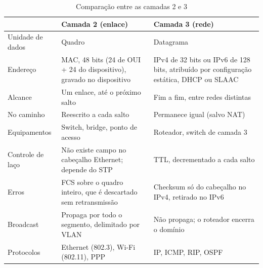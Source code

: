 \begin{table}[H]
\centering
\caption{Comparação entre as camadas 2 e 3}
\label{tab:q1_camadas}
\small
\renewcommand{\arraystretch}{1.2}
\begin{tabularx}{\textwidth}{@{}>{\raggedright\arraybackslash}p{2.9cm} X X@{}}
\toprule
 & \textbf{Camada 2 (enlace)} & \textbf{Camada 3 (rede)} \\
\midrule
Unidade de dados & Quadro & Datagrama \\
Endereço & MAC, 48 bits (24 de OUI + 24 do dispositivo), gravado no dispositivo & IPv4 de 32 bits ou IPv6 de 128 bits, atribuído por configuração estática, DHCP ou SLAAC \\
Alcance & Um enlace, até o próximo salto & Fim a fim, entre redes distintas \\
No caminho & Reescrito a cada salto & Permanece igual (salvo NAT) \\
Equipamentos & Switch, bridge, ponto de acesso & Roteador, switch de camada 3 \\
Controle de laço & Não existe campo no cabeçalho Ethernet; depende do STP & TTL, decrementado a cada salto \\
Erros & FCS sobre o quadro inteiro, que é descartado sem retransmissão & Checksum só do cabeçalho no IPv4, retirado no IPv6 \\
Broadcast & Propaga por todo o segmento, delimitado por VLAN & Não propaga; o roteador encerra o domínio \\
Protocolos & Ethernet (802.3), Wi-Fi (802.11), PPP & IP, ICMP, RIP, OSPF \\
\bottomrule
\end{tabularx}
\end{table}
